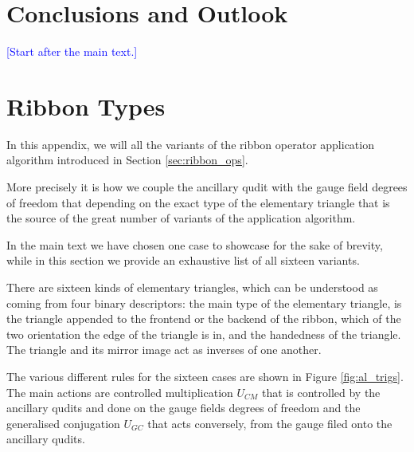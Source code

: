 \documentclass[two column]{article}
\newcommand{\jovan}[1]{\textcolor{blue}{[#1]}}
\begin{document}
\section{Conclusions and Outlook} \label{sec:outlook}

\jovan{Start after the main text.}


% 




%




\FloatBarrier
\onecolumn
\appendix

\section{Ribbon Types}\label{app:ribs}


In this appendix, we will all the variants of the ribbon operator application algorithm introduced in Section \ref{sec:ribbon_ops}.

More precisely it is how we couple the ancillary qudit with the gauge field degrees of freedom that depending on the exact type of the elementary triangle that is the source of the great number of variants of the application algorithm. 

In the main text we have chosen one case to showcase for the sake of brevity, while in this section we provide an exhaustive list of all sixteen variants.

There are sixteen kinds of elementary triangles, which can be understood as coming from four binary descriptors: the main type of the elementary triangle, is the triangle appended to the frontend or the backend of the ribbon, which of the two orientation the edge of the triangle is in, and the handedness of the triangle. The triangle and its mirror image act as inverses of one another.

The various different rules for the sixteen cases are shown in Figure \ref{fig:al_trigs}. The main actions are controlled multiplication $U_{CM}$ that is controlled by the ancillary qudits and done on the gauge fields degrees of freedom and the generalised conjugation $U_{GC}$ that acts conversely, from the gauge filed onto the ancillary qudits.
\end{document}
